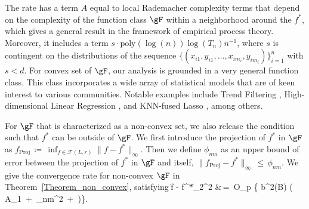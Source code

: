 \documentclass[twoside,11pt]{article}
\begin{document}
The rate has a term $A$ equal to local Rademacher complexity terms that depend on the complexity of the function class $\gF$ within a neighborhood around the $f^*$, which gives a general result in the framework of empirical process theory. Moreover, it includes a term \(s\cdot \text{poly}(\log (n))\log (T_n)n^{-1}\), where \(s\) is contingent on the distributions of the sequence \(\{(x_{i1}, y_{i1}, \dots, x_{im_i}, y_{im_i})\}^{n}_{i=1}\) with \(s < d\).   For convex set of $\gF$,
 our analysis is grounded in a very general function class. This class incorporates a wide array of statistical models that are of keen interest to various communities. Notable examples include Trend Filtering \cite{guntuboyina2020adaptive, tibshirani2014adaptive}, High-dimensional Linear Regression \cite{fu2000asymptotics, belloni2011}, and KNN-fused Lasso \cite{ferradans2014regularized, madrid2020adaptive}, among others.














For $\gF$ that is characterized as a non-convex set, we also release the condition such that $f^*$ can be outside of $\gF$. We first introduce the projection of $f^*$ in $\gF$ as $f_{\text{Proj}} \,\coloneqq\, \inf_{f \in \mathcal{F}(L,r)} \lVert f - f^* \rVert_{\infty}$. Then we define $\phi_{nm}$ as an upper bound of error between the projection of $f^*$ in $\gF$ and itself, $\| f_{\text{Proj}} - f^\ast \|_{\infty} \,\leq\, \phi_{nm}$. 
We give the convergence rate for non-convex $\gF$ in Theorem~\ref{Theorem_non_convex}, satisfying 
\bea 
\left\|\hat f - f^*\right\|_2^2 &\,=\, O_p \left\{ b^2(B) \left( A_1 \,+\,  \phi_{nm}^2 \,+\,   \right)\right\}. 
\bea 
\end{document}

